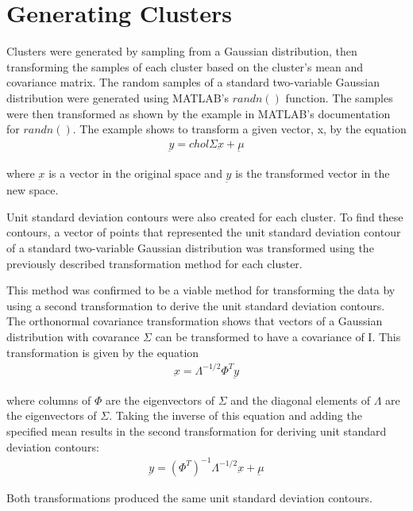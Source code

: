 \section{Generating Clusters}
Clusters were generated by sampling from a Gaussian distribution, then transforming the samples of each cluster based on the cluster's mean and covariance matrix. The random samples of a standard two-variable Gaussian distribution were generated using MATLAB's $randn()$ function. The samples were then transformed as shown by the example in MATLAB's documentation for $randn()$. The example shows to transform a given vector, x, by the equation
\begin{eqnarray}
\label{eqn:chol_transform}
\underbar{y} = chol \Sigma \underbar{x}+\underbar{\mu}
\end{eqnarray}

where $\underbar{x}$ is a vector in the original space and $\underbar{y}$ is the transformed vector in the new space.

Unit standard deviation contours were also created for each cluster. To find these contours, a vector of points that represented the unit standard deviation contour of a standard two-variable Gaussian distribution was transformed using the previously described transformation method for each cluster.

This method was confirmed to be a viable method for transforming the data by using a second transformation to derive the unit standard deviation contours. The orthonormal covariance transformation shows that vectors of a Gaussian distribution with covarance $\Sigma$ can be transformed to have a covariance of I. This transformation is given by the equation
\begin{eqnarray}
\label{eqn:ortho_transform}
\underbar{x} = {\Lambda}^{-1/2} \Phi^T \underbar{y}
\end{eqnarray}

where columns of $\Phi$ are the eigenvectors of $\Sigma$ and the diagonal elements of $\Lambda$ are the eigenvectors of $\Sigma$. Taking the inverse of this equation and adding the specified mean results in the second transformation for deriving unit standard deviation contours:
\begin{eqnarray}
\label{eqn:ortho_inv_transform}
\underbar{y} = {(\Phi^{T})}^{-1} \Lambda^{-1/2}\underbar{x}+\underbar{\mu}
\end{eqnarray}

Both transformations produced the same unit standard deviation contours.
 
